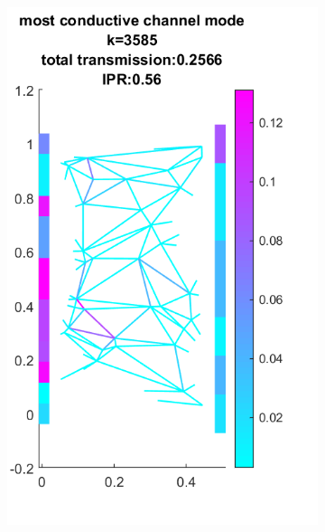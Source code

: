 \begin{figure}[htp]
    \centering
    \begin{subfigure}[b]{0.4\textwidth}
        \includegraphics[width=\textwidth]{ch3/fig3/channel_mode_N50D05d.png}
    \end{subfigure}
~\quad\quad
    \begin{subfigure}[b]{0.4\textwidth}

\end{subfigure}
\end{figure}
